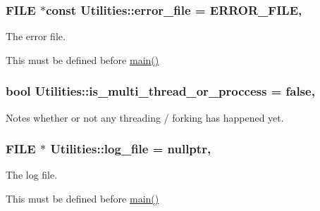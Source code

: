 \subsubsection[{\texorpdfstring{error\+\_\+file}{error_file}}]{\setlength{\rightskip}{0pt plus 5cm}F\+I\+LE $\ast$const Utilities\+::error\+\_\+file = {\bf E\+R\+R\+O\+R\+\_\+\+F\+I\+LE}\hspace{0.3cm}{\ttfamily [static]}, {\ttfamily [private]}}\hypertarget{class_utilities_afc3b1cf892b76cede8fa87bfdd17533c}{}\label{class_utilities_afc3b1cf892b76cede8fa87bfdd17533c}


The error file. 

This must be defined before \hyperlink{shadow__stack_8cpp_a0ddf1224851353fc92bfbff6f499fa97}{main()} 
\subsubsection[{\texorpdfstring{is\+\_\+multi\+\_\+thread\+\_\+or\+\_\+proccess}{is_multi_thread_or_proccess}}]{\setlength{\rightskip}{0pt plus 5cm}bool Utilities\+::is\+\_\+multi\+\_\+thread\+\_\+or\+\_\+proccess = false\hspace{0.3cm}{\ttfamily [static]}, {\ttfamily [private]}}\hypertarget{class_utilities_af893d8dcd5bb1ba3fc72fc108536bcbc}{}\label{class_utilities_af893d8dcd5bb1ba3fc72fc108536bcbc}


Notes whether or not any threading / forking has happened yet. 

\subsubsection[{\texorpdfstring{log\+\_\+file}{log_file}}]{\setlength{\rightskip}{0pt plus 5cm}F\+I\+LE $\ast$ Utilities\+::log\+\_\+file = nullptr\hspace{0.3cm}{\ttfamily [static]}, {\ttfamily [private]}}\hypertarget{class_utilities_a63ce9d08b6459cd102bb368a274aca07}{}\label{class_utilities_a63ce9d08b6459cd102bb368a274aca07}


The log file. 

This must be defined before \hyperlink{shadow__stack_8cpp_a0ddf1224851353fc92bfbff6f499fa97}{main()} 
